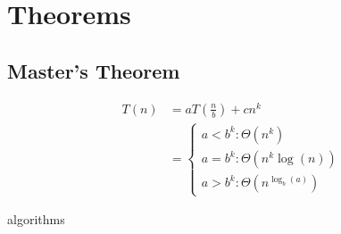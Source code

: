 \appendix

\chapter{Theorems}

  \section{Master's Theorem}

  \begin{align}
    T\left( n \right) &= a T\left( \frac{n}{b} \right) + cn^{k} \\
    &=
    \begin{cases}
      a < b^{k}: \Theta \left( n^{k} \right) \\
      a = b^{k}: \Theta \left( n^{k} \log\left( n \right) \right) \\
      a > b^{k}: \Theta \left( n^{\log_{b}\left( a \right)} \right)
    \end{cases}
  \end{align}

{algorithms}
